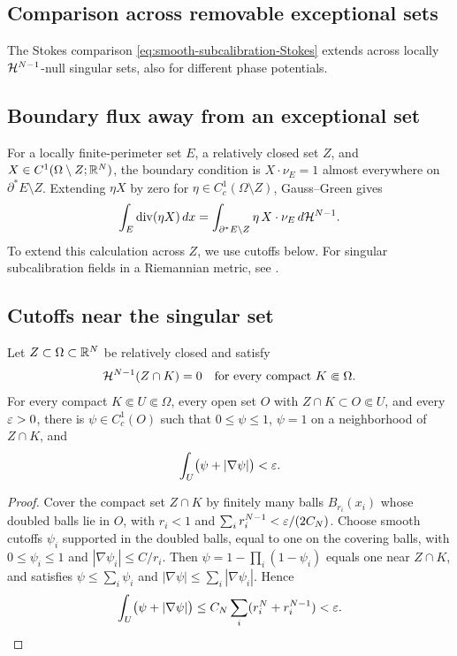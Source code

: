 \subsection{Comparison across removable exceptional sets}
\label{sec:comparison}

The Stokes comparison \eqref{eq:smooth-subcalibration-Stokes}
extends across locally \(\mathcal H^{N-1}\)-null singular sets,
also for different phase potentials.

\subsection*{Boundary flux away from an exceptional set}

For a locally finite-perimeter set \(E\), a relatively closed set
\(Z\), and \(X\in C^1(\Omega\setminus Z;\mathbb R^N)\), the boundary
condition is \(X\cdot\nu_E=1\) almost everywhere on
\(\partial^*E\setminus Z\). Extending \(\eta X\) by zero for
\(\eta\in C_c^1(\Omega\setminus Z)\), Gauss--Green gives
\[
 \int_E\operatorname{div}(\eta X)\,dx
 =\int_{\partial^*E\setminus Z}\eta\,X\cdot\nu_E\,d\mathcal H^{N-1}.
\]
To extend this calculation across \(Z\), we use cutoffs below.
For singular subcalibration fields in a Riemannian metric, see
\cite[Fact~2.3 and Section~7]{LiuSimon26}.

\subsection*{Cutoffs near the singular set}

\begin{lemma}
\label{lem:null-set-cutoffs}
Let \(Z\subset\Omega\subset\mathbb R^N\) be relatively closed and satisfy
\begin{equation}\label{eq:H-null}
 \mathcal H^{N-1}(Z\cap K)=0
 \quad\text{for every compact }K\Subset\Omega.
\end{equation}
For every compact \(K\Subset U\Subset\Omega\), every open set
\(O\) with \(Z\cap K\subset O\Subset U\), and every \(\varepsilon>0\),
there is \(\psi\in C_c^1(O)\) such that \(0\leq\psi\leq1\),
\(\psi=1\) on a neighborhood of \(Z\cap K\), and
\begin{equation}\label{eq:null-set-cutoff}
 \int_U\bigl(\psi+|\nabla\psi|\bigr)<\varepsilon.
\end{equation}
\end{lemma}

\begin{proof}
Cover the compact set \(Z\cap K\) by finitely many balls
\(B_{r_i}(x_i)\) whose doubled balls lie in \(O\), with
\(r_i<1\) and \(\sum_i r_i^{N-1}<\varepsilon/(2C_N)\).
Choose smooth cutoffs \(\psi_i\) supported in the doubled balls,
equal to one on the covering balls, with \(0\leq\psi_i\leq1\)
and \(|\nabla\psi_i|\leq C/r_i\).
Then \(\psi=1-\prod_i(1-\psi_i)\) equals one near \(Z\cap K\),
and satisfies \(\psi\leq\sum_i\psi_i\) and
\(|\nabla\psi|\leq\sum_i|\nabla\psi_i|\).  Hence
\[
 \int_U\bigl(\psi+|\nabla\psi|\bigr)
 \leq C_N\sum_i(r_i^N+r_i^{N-1})<\varepsilon.\qedhere
\]
\end{proof}

